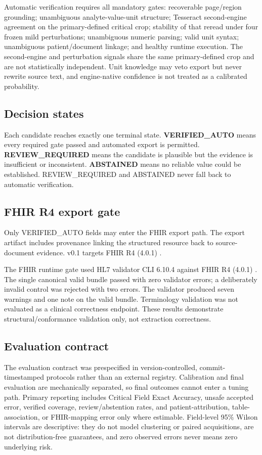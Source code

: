 \documentclass[10pt]{article}
\begin{document}
Automatic verification requires all mandatory gates: recoverable page/region grounding; unambiguous analyte-value-unit structure; Tesseract second-engine agreement on the primary-defined critical crop; stability of that reread under four frozen mild perturbations; unambiguous numeric parsing; valid unit syntax; unambiguous patient/document linkage; and healthy runtime execution. The second-engine and perturbation signals share the same primary-defined crop and are not statistically independent. Unit knowledge may veto export but never rewrite source text, and engine-native confidence is not treated as a calibrated probability.

\subsection{Decision states}

Each candidate reaches exactly one terminal state. \textbf{VERIFIED\_AUTO} means every required gate passed and automated export is permitted. \textbf{REVIEW\_REQUIRED} means the candidate is plausible but the evidence is insufficient or inconsistent. \textbf{ABSTAINED} means no reliable value could be established. REVIEW\_REQUIRED and ABSTAINED never fall back to automatic verification.

\subsection{FHIR R4 export gate}

Only VERIFIED\_AUTO fields may enter the FHIR export path. The export artifact includes provenance linking the structured resource back to source-document evidence. v0.1 targets FHIR R4 (4.0.1) \cite{hl7fhirr4}.

The FHIR runtime gate used HL7 validator CLI 6.10.4 against FHIR R4 (4.0.1) \cite{hl7fhirr4}. The single canonical valid bundle passed with zero validator errors; a deliberately invalid control was rejected with two errors. The validator produced seven warnings and one note on the valid bundle. Terminology validation was not evaluated as a clinical correctness endpoint. These results demonstrate structural/conformance validation only, not extraction correctness.

\subsection{Evaluation contract}

The evaluation contract was prespecified in version-controlled, commit-timestamped protocols rather than an external registry. Calibration and final evaluation are mechanically separated, so final outcomes cannot enter a tuning path. Primary reporting includes Critical Field Exact Accuracy, unsafe accepted error, verified coverage, review/abstention rates, and patient-attribution, table-association, or FHIR-mapping error only where estimable. Field-level 95\% Wilson intervals are descriptive: they do not model clustering or paired acquisitions, are not distribution-free guarantees, and zero observed errors never means zero underlying risk.
\end{document}
